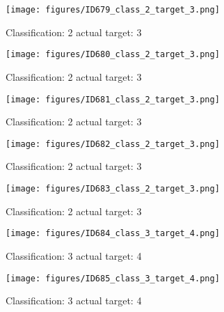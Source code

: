 \begin{figure}[h!]
\begin{center}
\texttt{[image: figures/ID679\_class\_2\_target\_3.png]}
\end{center}
\caption{ Classification: 2 actual target: 3}
\label{fig:ID679_class_2_target_3}
\end{figure}
\begin{figure}[h!]
\begin{center}
\texttt{[image: figures/ID680\_class\_2\_target\_3.png]}
\end{center}
\caption{ Classification: 2 actual target: 3}
\label{fig:ID680_class_2_target_3}
\end{figure}
\begin{figure}[h!]
\begin{center}
\texttt{[image: figures/ID681\_class\_2\_target\_3.png]}
\end{center}
\caption{ Classification: 2 actual target: 3}
\label{fig:ID681_class_2_target_3}
\end{figure}
\begin{figure}[h!]
\begin{center}
\texttt{[image: figures/ID682\_class\_2\_target\_3.png]}
\end{center}
\caption{ Classification: 2 actual target: 3}
\label{fig:ID682_class_2_target_3}
\end{figure}
\begin{figure}[h!]
\begin{center}
\texttt{[image: figures/ID683\_class\_2\_target\_3.png]}
\end{center}
\caption{ Classification: 2 actual target: 3}
\label{fig:ID683_class_2_target_3}
\end{figure}
\begin{figure}[h!]
\begin{center}
\texttt{[image: figures/ID684\_class\_3\_target\_4.png]}
\end{center}
\caption{ Classification: 3 actual target: 4}
\label{fig:ID684_class_3_target_4}
\end{figure}
\begin{figure}[h!]
\begin{center}
\texttt{[image: figures/ID685\_class\_3\_target\_4.png]}
\end{center}
\caption{ Classification: 3 actual target: 4}
\label{fig:ID685_class_3_target_4}
\end{figure}
